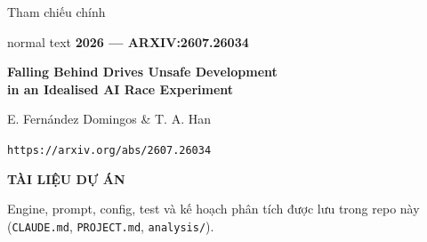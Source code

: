 \documentclass[9pt,aspectratio=169]{beamer}
\begin{document}
\begin{frame}{Tham chiếu chính}
\begin{beamercolorbox}[sep=.5cm,rounded=true]{normal text}
{\scriptsize\color{RaceCyanDark}\bfseries 2026 --- ARXIV:2607.26034}\par\vspace{.25cm}
{\large\bfseries Falling Behind Drives Unsafe Development\\in an Idealised AI Race Experiment}\par\vspace{.2cm}
{\normalsize E. Fernández Domingos \& T. A. Han}\par\vspace{.35cm}
{\color{RaceCyanDark}\texttt{https://arxiv.org/abs/2607.26034}}
\end{beamercolorbox}
\vspace{0.6em}
{\small\bfseries TÀI LIỆU DỰ ÁN}\par
{\color{RaceMuted}\small Engine, prompt, config, test và kế hoạch phân tích được lưu trong repo này (\texttt{CLAUDE.md}, \texttt{PROJECT.md}, \texttt{analysis/}).}
\end{frame}
\end{document}
